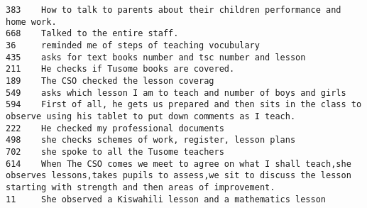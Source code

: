 \documentclass[11pt]{article}
\begin{document}
    \begin{Verbatim}[commandchars=\\\{\}]
383    How to talk to parents about their children performance and home work.                                                                                                                  
668    Talked to the entire staff.                                                                                                                                                             
36     reminded me of steps of teaching vocubulary                                                                                                                                             
435    asks for text books number and tsc number and lesson                                                                                                                                    
211    He checks if Tusome books are covered.                                                                                                                                                  
189    The CSO checked the lesson coverag                                                                                                                                                      
549    asks which lesson I am to teach and number of boys and girls                                                                                                                            
594    First of all, he gets us prepared and then sits in the class to observe using his tablet to put down comments as I teach.                                                               
222    He checked my professional documents                                                                                                                                                    
498    she checks schemes of work, register, lesson plans                                                                                                                                      
702    she spoke to all the Tusome teachers                                                                                                                                                    
614    When The CSO comes we meet to agree on what I shall teach,she observes lessons,takes pupils to assess,we sit to discuss the lesson starting with strength and then areas of improvement.
11     She observed a Kiswahili lesson and a mathematics lesson                                                                                                                                

\end{Verbatim}
\end{document}
